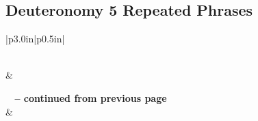 \subsection{Deuteronomy 5 Repeated Phrases}


\normalsize
 
\begin{center}
\begin{longtable}{|p{3.0in}|p{0.5in}|}
\caption[Deuteronomy 5 Repeated Phrases]{Deuteronomy 5 Repeated Phrases}\label{table:Repeated Phrases Deuteronomy 5} \\
\hline {} &  \\ \hline 
\endfirsthead
 
{{\bfseries \tablename\ \thetable{} -- continued from previous page}} \\  
\hline {} &  \\ \hline 
\endhead
 

\end{longtable}
\end{center}
